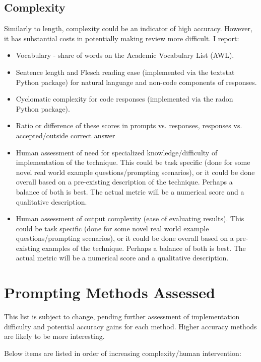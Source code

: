 \documentclass[11pt]{article}
\begin{document}
\subsection*{Complexity}

Similarly to length, complexity could be an indicator of high accuracy. However, it has substantial costs in potentially making review more difficult. I report:

\begin{itemize}
  \item Vocabulary - share of words on the Academic Vocabulary List (AWL). \cite{gardner_new_2014}
  \item Sentence length and Flesch reading ease (implemented via the textstat Python package) for natural language and non-code components of responses. \cite{flesch_how_2016, aggarwal_textstat_nodate} 
  \item Cyclomatic complexity for code responses (implemented via the radon Python package). \cite{lacchia_radon_nodate}
  \item Ratio or difference of these scores in prompts vs. responses, responses vs. accepted/outside correct answer
  \item Human assessment of need for specialized knowledge/difficulty of implementation of the technique. This could be task specific (done for some novel real world example questions/prompting scenarios), or it could be done overall based on a pre-existing description of the technique. Perhaps a balance of both is best. The actual metric will be a numerical score and a qualitative description.
  \item Human assessment of output complexity (ease of evaluating results). This could be task specific (done for some novel real world example questions/prompting scenarios), or it could be done overall based on a pre-existing examples of the technique. Perhaps a balance of both is best. The actual metric will be a numerical score and a qualitative description.
\end{itemize}

\section*{Prompting Methods Assessed}

This list is subject to change, pending further assessment of implementation difficulty and potential accuracy gains for each method. Higher accuracy methods are likely to be more interesting.

Below items are listed in order of increasing complexity/human intervention:
\end{document}
